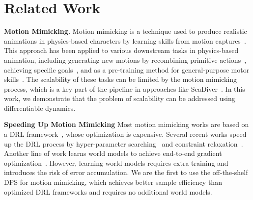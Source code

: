 \section{Related Work}

\textbf{Motion Mimicking.} 
Motion mimicking is a technique used to produce realistic animations in physics-based characters by learning skills from motion captures~\citep{hong2019physics, peng2018deepmimic, peng2018sfv, lee2019scalable}. This approach has been applied to various downstream tasks in physics-based animation, including generating new motions by recombining primitive actions~\citep{peng2019mcp, luo2020carl}, achieving specific goals~\citep{bergamin2019drecon,park2019learning, peng2021amp}, and as a pre-training method for general-purpose motor skills~\citep{merel2018hierarchical, hasenclever2020comic, peng2022ase, won2022physics}. The scalability of these tasks can be limited by the motion mimicking process, which is a key part of the pipeline in approaches like ScaDiver~\citep{won2020scalable}. In this work, we demonstrate that the problem of scalability can be addressed using differentiable dynamics.

\textbf{Speeding Up Motion Mimicking}
Most motion mimicking works are based on a DRL framework~\citep{peng2018deepmimic, bergamin2019drecon}, whose optimization is expensive. Several recent works speed up the DRL process by hyper-parameter searching~\citep{yang2021efficient} and constraint relaxation~\citep{ma2021learning}. Another line of work learns world models to achieve end-to-end gradient optimization~\citep{won2022physics, fussell2021supertrack}. However, learning world models requires extra training and introduces the risk of error accumulation. We are the first to use the off-the-shelf DPS for motion mimicking, which achieves better sample efficiency than optimized DRL frameworks and requires no additional world models.


